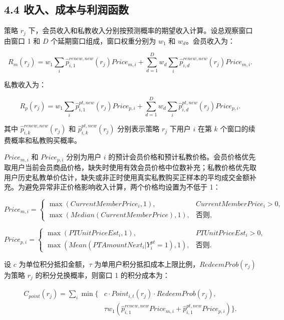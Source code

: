 \documentclass[
  12pt,
]{ctexart}
\begin{document}
\hypertarget{ux6536ux5165ux6210ux672cux4e0eux5229ux6da6ux51fdux6570}{%
\subsection{4.4 收入、成本与利润函数}\label{ux6536ux5165ux6210ux672cux4e0eux5229ux6da6ux51fdux6570}}

策略 \(r_j\) 下，会员收入和私教收入分别按预测概率的期望收入计算。设总观察窗口由窗口 1 和 \(D\) 个延期窗口组成，窗口权重分别为 \(w_1\) 和 \(w_d\)。会员收入为：

\[
R_m(r_j)=w_1\sum_i \hat p_{i,1}^{renew,new}(r_j)Price_{m,i}
+\sum_{d=1}^{D}w_d\sum_i \hat p_{i,d}^{renew,new}(r_j)Price_{m,i}.
\tag{29}
\]

私教收入为：

\[
R_p(r_j)=w_1\sum_i \hat p_{i,1}^{pt,new}(r_j)Price_{p,i}
+\sum_{d=1}^{D}w_d\sum_i \hat p_{i,d}^{pt,new}(r_j)Price_{p,i}.
\tag{30}
\]

其中 \(\hat p_{i,k}^{renew,new}(r_j)\) 和 \(\hat p_{i,k}^{pt,new}(r_j)\) 分别表示策略 \(r_j\) 下用户 \(i\) 在第 \(k\) 个窗口的续费概率和私教购买概率。

\(Price_{m,i}\) 和 \(Price_{p,i}\) 分别为用户 \(i\) 的预计会员价格和预计私教价格。会员价格优先取用户当前会员商品价格，缺失时使用有效会员价格中位数补充；私教价格优先取用户历史私教单价估计，缺失或非正时使用真实私教购买正样本的平均成交金额补充。为避免异常非正价格影响收入计算，两个价格均设置为不低于 1：

\[
Price_{m,i}=
\begin{cases}
\max(CurrentMemberPrice_i,1), & CurrentMemberPrice_i>0,\\
\max(Median(CurrentMemberPrice),1), & \text{否则},
\end{cases}
\tag{31}
\]

\[
Price_{p,i}=
\begin{cases}
\max(PTUnitPriceEst_i,1), & PTUnitPriceEst_i>0,\\
\max(Mean(PTAmountNext_i|Y_i^{pt}=1),1), & \text{否则}.
\end{cases}
\tag{32}
\]

设 \(c\) 为单位积分抵扣金额，\(\tau\) 为单用户积分抵扣成本上限比例，\(RedeemProb(r_j)\) 为策略 \(r_j\) 的积分兑换概率，则窗口 1 的积分成本为：

\[
\begin{aligned}
C_{point}(r_j)=\sum_i \min\{&
c\cdot Point_{i,t}(r_j)\cdot RedeemProb(r_j),\\
&\tau w_1\left(\hat p_{i,1}^{renew,new}Price_{m,i}
+\hat p_{i,1}^{pt,new}Price_{p,i}\right)\}.
\end{aligned}
\tag{33}
\]
\end{document}
